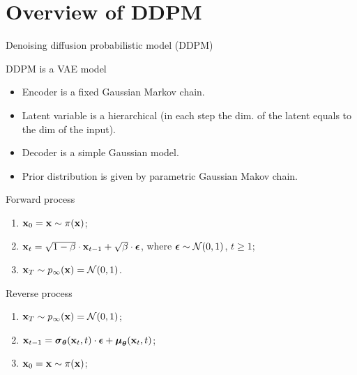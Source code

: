 \section{Overview of DDPM}
\begin{frame}{Denoising diffusion probabilistic model (DDPM)}
	\begin{block}{DDPM is a VAE model}
		\begin{itemize}
			\item Encoder is a fixed Gaussian Markov chain.
			\item Latent variable is a hierarchical (in each step the dim. of the latent equals to the dim of the input).
			\item Decoder is a simple Gaussian model.
			\item Prior distribution is given by parametric Gaussian Makov chain.
		\end{itemize}
	\end{block}
	\begin{minipage}{0.5\linewidth}
		\begin{block}{Forward process}
			\begin{enumerate}
				\item $\mathbf{x}_0 = \mathbf{x} \sim \pi(\mathbf{x})$;
				\item $\mathbf{x}_t = \sqrt{1 - \beta} \cdot \mathbf{x}_{t - 1} + \sqrt{\beta} \cdot \boldsymbol{\epsilon}$, where $\boldsymbol{\epsilon} \sim \mathcal{N}(0, 1)$, $t \geq 1$;
				\item $\mathbf{x}_T \sim p_{\infty}(\mathbf{x}) = \mathcal{N}(0, 1)$.
			\end{enumerate}
		\end{block}
	\end{minipage}%
	\begin{minipage}{0.5\linewidth}
		\begin{block}{Reverse process}
			\begin{enumerate}
				\item $\mathbf{x}_T \sim p_{\infty}(\mathbf{x}) = \mathcal{N}(0, 1)$;
				\item $\mathbf{x}_{t - 1} = \boldsymbol{\sigma}_{\boldsymbol{\theta}}(\mathbf{x}_t, t) \cdot \boldsymbol{\epsilon} + \boldsymbol{\mu}_{\boldsymbol{\theta}}(\mathbf{x}_t, t)$;
				\item $\mathbf{x}_0 = \mathbf{x} \sim \pi(\mathbf{x})$;
			\end{enumerate}
		\end{block}
	\end{minipage}
\end{frame}

